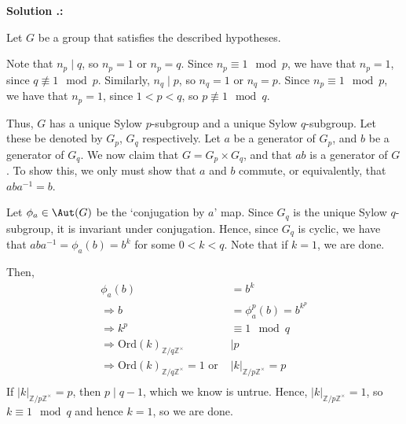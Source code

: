 \documentclass[12pt]{scrartcl}
\newcounter{soln}[section]
\renewcommand{\thesoln}{\thesection.\arabic{soln}}
\renewenvironment{soln}
  {\refstepcounter{soln}%
   \begin{mdframed}[style=mdplainbox]\noindent\textbf{Solution \thesoln:}\par\smallskip\ignorespacesafterend}
  {\end{mdframed}}
\begin{document}
\begin{soln}[Exercise 10]
Let $G$ be a group that satisfies the described hypotheses.

Note that $n_p \mid q$, so $n_p = 1$ or $n_p = q$.
Since $n_p \equiv 1 \mod p$, we have that $n_p = 1$, since $q \not \equiv 1 \mod p$.
Similarly, $n_q \mid p$, so $n_q = 1$ or $n_q = p$.
Since $n_p \equiv 1 \mod p$, we have that $n_p = 1$, since $1 < p < q$, so $p \not \equiv 1 \mod q$.

Thus, $G$ has a unique Sylow $p$-subgroup and a unique Sylow $q$-subgroup.
Let these be denoted by $G_p$, $G_q$ respectively.
Let $a$ be a generator of $G_p$, and $b$ be a generator of $G_q$.  
We now claim that $G = G_p \times G_q$, and that $ab$ is a generator of $G$.
To show this, we only must show that $a$ and $b$ commute, or equivalently, that $aba^{-1} = b$.  

Let $\phi_a \in \Aut(G)$ be the `conjugation by $a$' map.
Since $G_q$ is the unique Sylow $q$-subgroup, it is invariant under conjugation.
Hence, since $G_q$ is cyclic, we have that $aba^{-1} = \phi_a(b) = b^k$ for some $0< k < q$.
Note that if $k=1$, we are done.

Then, 
\begin{align*}
	\phi_a(b) &= b^k \\
	\Rightarrow b &= \phi^p_a(b)= b^{k^p} \\
	\Rightarrow k^p &\equiv 1 \mod q \\
	\Rightarrow \mathrm{Ord}(k)_{\mathbb{Z}/q \mathbb{Z}^{\times}} &\mid p \\
	\Rightarrow \mathrm{Ord}(k)_{\mathbb{Z}/q \mathbb{Z}^{\times}} = 1 \textrm{ or } &|k|_{\mathbb{Z}/p \mathbb{Z}^{\times}} = p \\
\end{align*}
If $|k|_{\mathbb{Z}/p \mathbb{Z}^{\times}} = p$, then $p \mid q-1$, which we know is untrue.
Hence, $|k|_{\mathbb{Z}/p \mathbb{Z}^{\times}} = 1$, so $k \equiv 1 \mod q$ and hence $k=1$, so we are done.
\end{soln}
\end{document}
